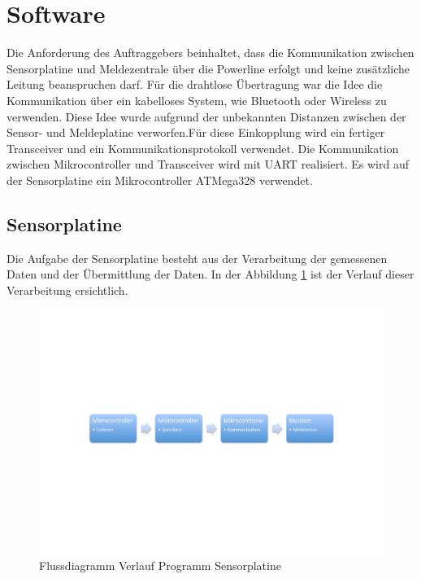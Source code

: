 %
%
%

\section{Software}
Die Anforderung des Auftraggebers beinhaltet, dass die Kommunikation zwischen Sensorplatine und Meldezentrale über die Powerline erfolgt und keine zusätzliche Leitung beanspruchen darf. Für die drahtlose Übertragung war die Idee die Kommunikation über ein kabelloses System, wie Bluetooth oder Wireless zu verwenden. Diese Idee wurde aufgrund der unbekannten Distanzen zwischen der Sensor- und Meldeplatine verworfen.Für diese Einkopplung wird ein fertiger Transceiver und ein Kommunikationsprotokoll verwendet. Die Kommunikation zwischen Mikrocontroller und Transceiver wird mit UART realisiert. Es wird auf der Sensorplatine ein Mikrocontroller ATMega328 verwendet.


\subsection{Sensorplatine}
Die Aufgabe der Sensorplatine besteht aus der Verarbeitung der gemessenen Daten und der Übermittlung der Daten. In der Abbildung \ref{fig:Software_Flussdiagramm_Sensorplatine} ist der Verlauf dieser Verarbeitung ersichtlich.

\begin{figure}[htbp] 
  \centering
     \includegraphics[width=1\textwidth]{graphics/Software_Flussdiagramm_Sensorplatine}
  \caption{Flussdiagramm Verlauf Programm Sensorplatine}
  \label{fig:Software_Flussdiagramm_Sensorplatine}
\end{figure}

